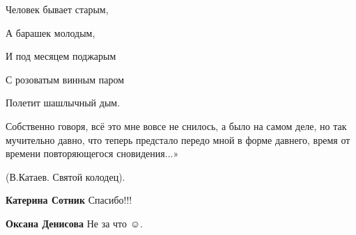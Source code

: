 \begin{itemize}
Человек бывает старым,

А барашек молодым,

И под месяцем поджарым

С розоватым винным паром

Полетит шашлычный дым.

Собственно говоря, всё это мне вовсе не снилось, а было на самом деле, но так
мучительно давно, что теперь предстало передо мной в форме давнего, время от
времени повторяющегося сновидения...»

(В.Катаев. Святой колодец).

\begin{itemize} %
\textbf{Катерина Сотник} Спасибо!!!

\textbf{Оксана Денисова}
Не за что ☺.
\end{itemize} %

\end{itemize} %
